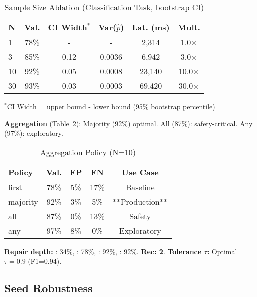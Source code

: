\documentclass[sigconf]{acmart}
\newcommand{\breakablefunction}[1]{\texttt{\seqsplit{#1}}}
\begin{document}
\begin{table}[H]
\centering
\caption{Sample Size Ablation (Classification Task, bootstrap CI)}
\label{tab:ablation_n}
\footnotesize
\begin{tabular}{@{}lccccc@{}}
\toprule
\textbf{N} & \textbf{Val.} & \textbf{CI Width}\(^*\) & \textbf{Var(\(\hat{p}\))} & \textbf{Lat. (ms)} & \textbf{Mult.} \\
\midrule
1 & 78\% & - & - & 2,314 & 1.0\(\times\) \\
3 & 85\% & 0.12 & 0.0036 & 6,942 & 3.0\(\times\) \\
10 & 92\% & 0.05 & 0.0008 & 23,140 & 10.0\(\times\) \\
30 & 93\% & 0.03 & 0.0003 & 69,420 & 30.0\(\times\) \\
\bottomrule
\end{tabular}
\vspace{1mm}
\footnotesize\(^*\)CI Width = upper bound - lower bound (95\% bootstrap percentile)
\end{table}

\textbf{Aggregation} (Table~\ref{tab:ablation_agg}): Majority (92\%) optimal. 
All (87\%): safety-critical. Any (97\%): exploratory.

\begin{table}[H]
\centering
\caption{Aggregation Policy (N=10)}
\label{tab:ablation_agg}
\footnotesize
\begin{tabular}{@{}lcccc@{}}
\toprule
\textbf{Policy} & \textbf{Val.} & \textbf{FP} & \textbf{FN} & \textbf{Use Case} \\
\midrule
first & 78\% & 5\% & 17\% & Baseline \\
majority & 92\% & 3\% & 5\% & **Production** \\
all & 87\% & 0\% & 13\% & Safety \\
any & 97\% & 8\% & 0\% & Exploratory \\
\bottomrule
\end{tabular}
\end{table}

\textbf{Repair depth:} \breakablefunction{max\_steps=0}: 34\%, \breakablefunction{=1}: 78\%, \breakablefunction{=2}: 92\%, \breakablefunction{=3}: 92\%. 
\textbf{Rec: 2}. 
\textbf{Tolerance \( \tau \):} Optimal \( \tau = 0.9 \) (F1=0.94).

\subsection{Seed Robustness}
\end{document}
